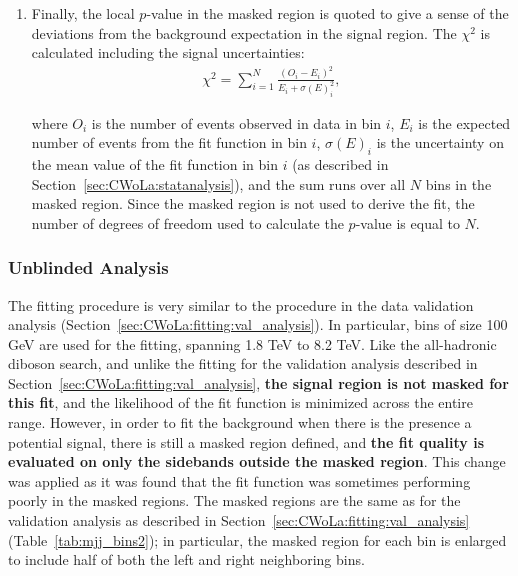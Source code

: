 \begin{enumerate}
\item Finally, the local $p$-value in the masked region is quoted to give a sense of the deviations from the background expectation in the signal region.
The $\chi^2$ is calculated including the signal uncertainties:
\begin{align}
  \chi^2=\sum_{i=1}^N \frac{(O_i-E_i)^2}{E_i+\sigma(E)^2_i},
\end{align}

\noindent where $O_i$ is the number of events observed in data in bin $i$, $E_i$ is the expected number of events from the fit function in bin $i$, $\sigma(E)_i$ is the uncertainty on the mean value of the fit function in bin $i$ (as described in Section~\ref{sec:CWoLa:statanalysis}), and the sum runs over all $N$ bins in the masked region.
Since the masked region is not used to derive the fit, the number of degrees of freedom used to calculate the $p$-value is equal to $N$.

\end{enumerate}

\subsubsection{Unblinded Analysis}
\label{sec:CWoLa:fitting:unblinded}
The fitting procedure is very similar to the procedure in the data validation analysis (Section~\ref{sec:CWoLa:fitting:val_analysis}).
In particular, bins of size 100 GeV are used for the fitting, spanning 1.8 TeV to 8.2 TeV.
Like the all-hadronic diboson search, and unlike the fitting for the validation analysis described in Section~\ref{sec:CWoLa:fitting:val_analysis}, \textbf{the signal region is not masked for this fit}, and the likelihood of the fit function is minimized across the entire range.
However, in order to fit the background when there is the presence a potential signal, there is still a masked region defined, and \textbf{the fit quality is evaluated on only the sidebands outside the masked region}.
This change was applied as it was found that the fit function was sometimes performing poorly in the masked regions.
The masked regions are the same as for the validation analysis as described in Section~\ref{sec:CWoLa:fitting:val_analysis} (Table~\ref{tab:mjj_bins2}); in particular, the masked region for each bin is enlarged to include half of both the left and right neighboring bins.

